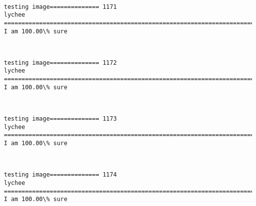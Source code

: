 \documentclass[11pt]{article}
\begin{document}
    \begin{center}
    \end{center}
    { \hspace*{\fill} \\}
    
    \begin{Verbatim}[commandchars=\\\{\}]
testing image============== 1171
lychee
============================================================================
I am 100.00\% sure

    \end{Verbatim}

    \begin{center}
    \end{center}
    { \hspace*{\fill} \\}
    
    \begin{Verbatim}[commandchars=\\\{\}]
testing image============== 1172
lychee
============================================================================
I am 100.00\% sure

    \end{Verbatim}

    \begin{center}
    \end{center}
    { \hspace*{\fill} \\}
    
    \begin{Verbatim}[commandchars=\\\{\}]
testing image============== 1173
lychee
============================================================================
I am 100.00\% sure

    \end{Verbatim}

    \begin{center}
    \end{center}
    { \hspace*{\fill} \\}
    
    \begin{Verbatim}[commandchars=\\\{\}]
testing image============== 1174
lychee
============================================================================
I am 100.00\% sure

    \end{Verbatim}
\end{document}
